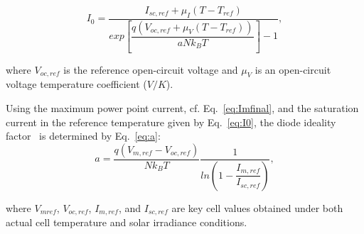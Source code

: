 \documentclass[review]{elsarticle}
\begin{document}
\begin{equation}
\label{eq:I0}
I_{0} = \dfrac{I_{sc,ref} + \mu_{I}(T - T_{ref})}{exp \left[ \dfrac{q(V_{oc,ref} + \mu_{V} (T - T_{ref}))}{aNk_{B}T}    \right] -1},
\end{equation}

\noindent where $ V_{oc,ref} $ is the reference open-circuit voltage and $ \mu_{V} $ is an open-circuit voltage temperature coefficient ($ V/K $).

Using the maximum power point current, cf. Eq.~\eqref{eq:Imfinal}, and the saturation current in the reference temperature given by Eq.~\eqref{eq:I0}, the diode ideality factor~\citep{Saloux} is determined by Eq.~\eqref{eq:a}:
\begin{equation}
\label{eq:a}
a = \dfrac{q(V_{m,ref}-V_{oc,ref})}{Nk_{B}T} \dfrac{1}{ln \left( 1 - \dfrac{I_{m,ref}}{I_{sc,ref}}  \right) },
\end{equation}

\noindent where $V_{mref}$, $V_{oc,ref}$, $I_{m,ref}$, and $I_{sc,ref}$ are key cell values obtained under both actual cell temperature and solar irradiance conditions. %

%
%
%
%
%
%
  
\end{document}
